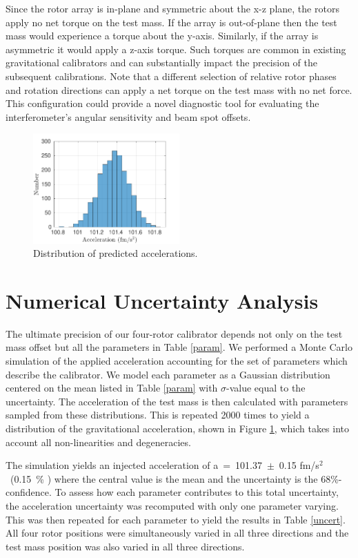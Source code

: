 \documentclass[superscriptaddress, twocolumn, prd]{revtex4-1}
\begin{document}
Since the rotor array is in-plane and symmetric about the x-z plane, the rotors apply no net torque on the test mass. If the array is out-of-plane then the test mass would experience a torque about the y-axis. Similarly, if the array is asymmetric it would apply a z-axis torque. Such torques are common in existing gravitational calibrators and can substantially impact the precision of the subsequent calibrations. Note that a different selection of relative rotor phases and rotation directions can apply a net torque on the test mass with no net force. This configuration could provide a novel diagnostic tool for evaluating the interferometer's angular sensitivity and beam spot offsets.

\begin{figure}[!h]
\centering \includegraphics[width=0.5\textwidth]{Super4_Dist.pdf}
\caption{Distribution of predicted accelerations.}
\label{dist} 
\end{figure}

\section{Numerical Uncertainty Analysis}

The ultimate precision of our four-rotor calibrator depends not only on the test mass offset but all the parameters in Table \ref{param}. We performed a Monte Carlo simulation of the applied acceleration accounting for the set of parameters which describe the calibrator. We model each parameter as a Gaussian distribution centered on the mean listed in Table \ref{param} with $\sigma$-value equal to the uncertainty. The acceleration of the test mass is then calculated with parameters sampled from these distributions. This is repeated 2000 times to yield a distribution of the gravitational acceleration, shown in Figure \ref{dist}, which takes into account all non-linearities and degeneracies. 


The simulation yields an injected acceleration of a~=~101.37~$\pm$~0.15 fm/s$^2$~(0.15~\% ) where the central value is the mean and the uncertainty is the 68\%-confidence. To assess how each parameter contributes to this total uncertainty, the acceleration uncertainty was recomputed with only one parameter varying. This was then repeated for each parameter to yield the results in Table \ref{uncert}. All four rotor positions were simultaneously varied  in all three directions and the test mass position was also varied in all three directions.
\end{document}
